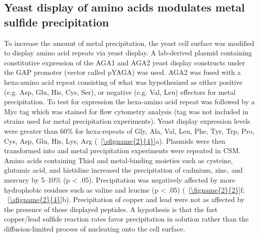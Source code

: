 \documentclass[../main/main]{subfiles}
\begin{document}
\subsection{Yeast display of amino acids modulates metal sulfide precipitation}
To increase the amount of metal precipitation, the yeast cell surface was modified to display amino acid repeats via yeast display. A lab-derived plasmid containing constitutive expression of the AGA1 and AGA2 yeast display constructs under the GAP promoter (vector called pYAGA) was used. AGA2 was fused with a hexa-amino acid repeat consisting of what was hypothesized as either positive (e.g. Asp, Glu, His, Cys, Ser), or negative  (e.g. Val, Leu) effectors for metal precipitation. To test for expression the hexa-amino acid repeat was followed by a Myc tag which was stained for flow cytometry analysis (tag was not included in strains used for metal precipitation experiments). Yeast display expression levels were greater than 60\% for hexa-repeats of Gly, Ala, Val, Leu, Phe, Tyr, Trp, Pro, Cys, Asp, Glu, His, Lys, Arg (\sFIGURE~\ref{\sfigname{2}{4}}a). Plasmids were then transformed into  and metal precipitation experiments were repeated in CSM. Amino acids containing Thiol and metal-binding moieties such as cysteine, glutamic acid, and histidine increased the precipitation of cadmium, zinc, and mercury by 5--10\% (p < .05). Precipitation was negatively affected by more hydrophobic residues such as valine and leucine (p < .05) (\FIGURE~\ref{\figname{2}{2}}f; \sFIGURE~\ref{\sfigname{2}{4}}b). Precipitation of copper and lead were not as affected by the presence of these displayed peptides. A hypothesis is that the fast copper/lead sulfide reaction rates favor precipitation in solution rather than the diffusion-limited process of nucleating onto the cell surface.

\end{document}
